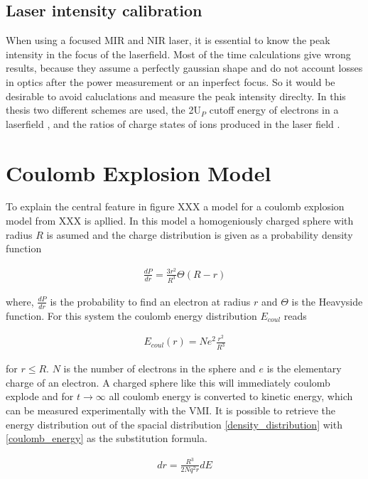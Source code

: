 \subsection{Laser intensity calibration}
When using a focused MIR and NIR laser, it is essential to know the peak intensity in the focus of the laserfield. Most of the time calculations give wrong results, because they assume a perfectly gaussian shape and do not account losses in optics after the power measurement or an inperfect focus. So it would be desirable to avoid caluclations and measure the peak intensity direclty. In this thesis two different schemes are used, the 2U$_P$ cutoff energy of electrons in a laserfield \cite{Becker_2018}, \cite{becker_vuv_1996} and the ratios of charge states of ions produced in the laser field \cite{augst_laser_1991}.




\section{Coulomb Explosion Model}
To explain the central feature in figure XXX a model for a coulomb explosion model from XXX is apllied. In this model a homogeniously charged sphere with radius $R$ is asumed and the charge distribution is given as a probability density function

\begin{align}
\frac{dP}{dr}=\frac{3 r^2}{R^3} \Theta (R-r)
\label{density_distribution}
\end{align}

where, $\frac{dP}{dr}$ is the probability to find an electron at radius $r$ and $\Theta$ is the Heavyside function. For this system the coulomb energy distribution $E_{coul}$ reads

\begin{align}
E_{coul}(r)=Ne^2 \frac{r^2}{R^3}
\label{coulomb_energy}
\end{align}

for $r\leq R$. $N$ is the number of electrons in the sphere and $e$ is the elementary charge of an electron. A charged sphere like this will immediately coulomb explode and for $t \longrightarrow \infty$ all coulomb energy is converted to kinetic energy, which can be measured experimentally with the VMI. It is possible to retrieve the energy distribution out of the spacial distribution \ref{density_distribution} with \ref{coulomb_energy} as the substitution formula.

\begin{align}
dr=\frac{R^3}{2Nq^2r}dE
\label{substitution}
\end{align}

